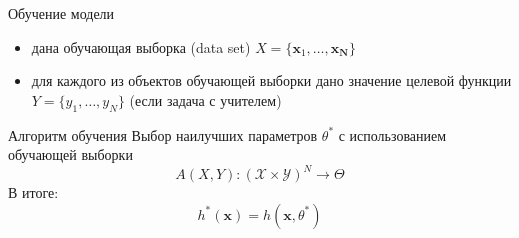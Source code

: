\documentclass[aspectratio=169]{beamer}
\begin{document}
\begin{frame}{Обучение модели}

\begin{itemize}
\item дана обучающая выборка (data set) $X = \{{\mathbf{x}_1, \ldots, \mathbf{x_N}}\}$
\item для каждого из объектов обучающей выборки дано значение целевой функции $Y = \{y_1, \ldots, y_N\}$ (если задача с учителем)
\end{itemize}

\begin{block}{Алгоритм обучения}
Выбор наилучших параметров $\theta^*$ с использованием обучающей выборки
\[
A(X, Y): (\mathcal{X} \times \mathcal{Y})^N \rightarrow \Theta
\]
В итоге:
\[
h^*(\mathbf{x}) = h(\mathbf{x}, \theta^*)
\]
\end{block}

\end{frame}
\end{document}
